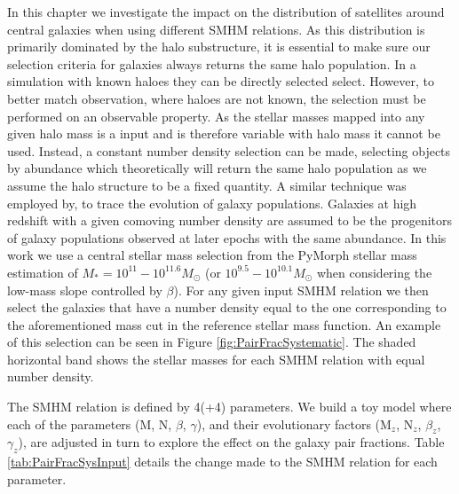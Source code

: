 In this chapter we investigate the impact on the distribution of satellites around central galaxies when using different SMHM relations. 
As this distribution is primarily dominated by the halo substructure, it is essential to make sure our selection criteria for galaxies always returns the same halo population. 
In a simulation with known haloes they can be directly selected select. However, to better match observation, where haloes are not known, the selection must be performed on an observable property.
As the stellar masses mapped into any given halo mass is a input and is therefore variable with halo mass it cannot be used. 
Instead, a constant number density selection can be made, selecting objects by abundance which theoretically will return the same halo population as we assume the halo structure to be a fixed quantity.
A similar technique was employed by, \citet[e.g.][]{vanDokkum2013The2.5, Huertas-Company2016MassCANDELS, Leja2013TRACINGSELECTION, Mundy2015Tracing3} to trace the evolution of galaxy populations. Galaxies at high redshift with a given comoving number density are assumed to be the progenitors of galaxy populations observed at later epochs with the same abundance. 
In this work we use a central stellar mass selection from the PyMorph stellar mass estimation of $M_{*} = 10^{11} - 10^{11.6} M_{\odot}$ (or $10^{9.5} - 10^{10.1} M_{\odot}$ when considering the low-mass slope controlled by $\beta$). For any given input SMHM relation we then select the galaxies that have a number density equal to the one corresponding to the aforementioned mass cut in the reference stellar mass function.
An example of this selection can be seen in Figure \ref{fig:PairFracSystematic}.
The shaded horizontal band shows the stellar masses for each SMHM relation with equal number density.

The SMHM relation is defined by 4(+4) parameters. We build a toy model where each of the parameters (M, N, $\beta$, $\gamma$), and their evolutionary factors (M$_z$, N$_z$, $\beta_z$, $\gamma_z$), are adjusted in turn to explore the effect on the galaxy pair fractions. Table \ref{tab:PairFracSysInput} details the change made to the SMHM relation for each parameter. 

